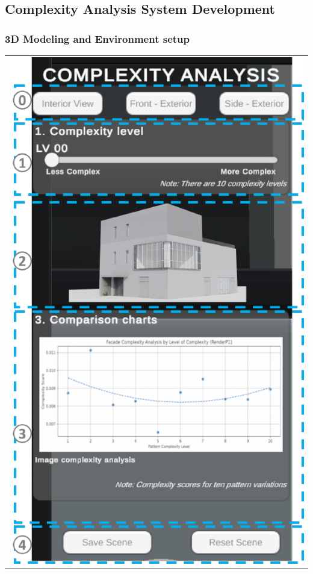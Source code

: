 \documentclass[final,5p,times]{elsarticle}%
\begin{document}
\begin{linenumbers}
    \subsection{Complexity Analysis System Development}
    \label{subsec:ComplexitySystemDevelopment}
    

    \subsubsection{3D Modeling and Environment setup}
    \label{subsubsec:3DModeling}
    

    \begin{table}[htb]
        \centering
        \small
        \begin{tabular}{c}
            \begin{minipage}{\textwidth}
                \centering
                  \includegraphics[width= \linewidth]{Images/VRInterface}

\end{minipage}
\end{tabular}
\end{table}
\end{linenumbers}
\end{document}
